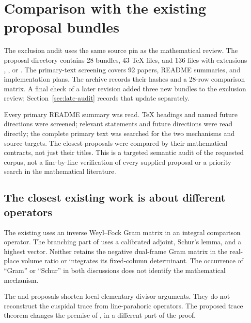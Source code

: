 \section{Comparison with the existing proposal bundles}\label{sec:audit}

The exclusion audit uses the same source pin as the mathematical review.
The proposal directory contains 28 bundles, 43 TeX files, and 136 files with
extensions , , or . The primary-text screening
covers 92 papers, README summaries, and implementation plans. The archive records
their hashes and a 28-row comparison matrix.
A final check of a later revision added three new bundles to the exclusion review;
Section~\ref{sec:late-audit} records that update separately.

Every primary README summary was read. TeX headings and named future directions
were screened; relevant statements and future directions were read directly;
the complete primary text was searched for the two mechanisms and source targets.
The closest proposals were compared by their mathematical contracts, not just
their titles. This is a targeted semantic audit of the requested corpus, not
a line-by-line verification of every supplied proposal or a priority search in
the mathematical literature.

\subsection{The closest existing work is about different operators}

The existing 
uses an inverse Weyl--Fock Gram matrix in an integral comparison operator.
The branching part of 
uses a calibrated adjoint, Schur's lemma, and a highest vector.
Neither retains the negative dual-frame Gram matrix in the real-place volume
ratio or integrates its fixed-column determinant. The occurrence of ``Gram''
or ``Schur'' in both discussions does not identify the mathematical mechanism.

The  and
 proposals shorten local
elementary-divisor arguments. They do not reconstruct the cuspidal trace from
line-parahoric operators. The proposed trace theorem changes the premise of
, in a different part of the proof.

